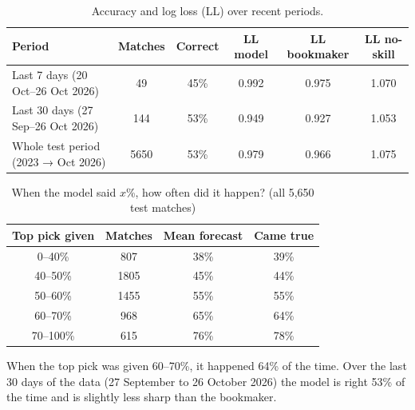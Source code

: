 \documentclass[11pt,a4paper]{article}
\theoremstyle{definition}
\theoremstyle{remark}
\begin{document}
\begin{table}[H]
\caption{Accuracy and log loss (LL) over recent periods.}
\begin{center}
\small
\begin{tabular}{lccccc}
\toprule
\textbf{Period} & \textbf{Matches} & \textbf{Correct} & \textbf{LL model} & \textbf{LL bookmaker} & \textbf{LL no-skill} \\
\midrule
Last 7 days (20 Oct--26 Oct 2026) & 49 & 45\% & 0.992 & 0.975 & 1.070 \\
Last 30 days (27 Sep--26 Oct 2026) & 144 & 53\% & 0.949 & 0.927 & 1.053 \\
Whole test period (2023 → Oct 2026) & 5650 & 53\% & 0.979 & 0.966 & 1.075 \\
\bottomrule
\end{tabular}
\end{center}
\end{table}

\begin{table}[H]
\caption{When the model said $x$\%, how often did it happen? (all 5{,}650 test matches)}
\begin{center}
\small
\begin{tabular}{cccc}
\toprule
\textbf{Top pick given} & \textbf{Matches} & \textbf{Mean forecast} & \textbf{Came true} \\
\midrule
0--40\% & 807 & 38\% & 39\% \\
40--50\% & 1805 & 45\% & 44\% \\
50--60\% & 1455 & 55\% & 55\% \\
60--70\% & 968 & 65\% & 64\% \\
70--100\% & 615 & 76\% & 78\% \\
\bottomrule
\end{tabular}
\end{center}
\end{table}

When the top pick was given 60--70\%, it happened 64\% of the time. Over the last 30 days of the data (27 September to 26 October 2026) the model is right 53\% of the time and is slightly less sharp than the bookmaker.
\end{document}
